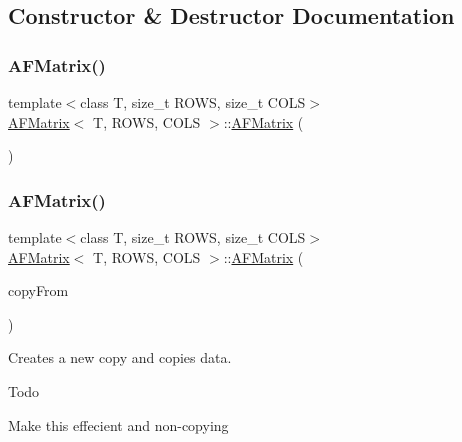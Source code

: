 \subsection{Constructor \& Destructor Documentation}
\mbox{\label{class_a_f_matrix_a6ccd1bdad16dfa7ef38db5e0fc4e0e2b}} 
\subsubsection{\texorpdfstring{A\+F\+Matrix()}{AFMatrix()}\hspace{0.1cm}{\footnotesize\ttfamily [1/3]}}
{\footnotesize\ttfamily template$<$class T, size\+\_\+t R\+O\+WS, size\+\_\+t C\+O\+LS$>$ \\
\hyperlink{class_a_f_matrix}{A\+F\+Matrix}$<$ T, R\+O\+WS, C\+O\+LS $>$\+::\hyperlink{class_a_f_matrix}{A\+F\+Matrix} (\begin{DoxyParamCaption}{ }\end{DoxyParamCaption})\hspace{0.3cm}{\ttfamily [inline]}}

\mbox{\label{class_a_f_matrix_ae76418eb02f3f9b84ee13aebaeca564a}} 
\subsubsection{\texorpdfstring{A\+F\+Matrix()}{AFMatrix()}\hspace{0.1cm}{\footnotesize\ttfamily [2/3]}}
{\footnotesize\ttfamily template$<$class T, size\+\_\+t R\+O\+WS, size\+\_\+t C\+O\+LS$>$ \\
\hyperlink{class_a_f_matrix}{A\+F\+Matrix}$<$ T, R\+O\+WS, C\+O\+LS $>$\+::\hyperlink{class_a_f_matrix}{A\+F\+Matrix} (\begin{DoxyParamCaption}\item[{\hyperlink{class_a_f_matrix}{A\+F\+Matrix}$<$ T, R\+O\+WS, C\+O\+LS $>$ $\ast$}]{copy\+From }\end{DoxyParamCaption})\hspace{0.3cm}{\ttfamily [inline]}}

Creates a new copy and copies data. \begin{DoxyRefDesc}{Todo}
\item[\hyperlink{todo__todo000002}{Todo}]Make this effecient and non-\/copying \end{DoxyRefDesc}

